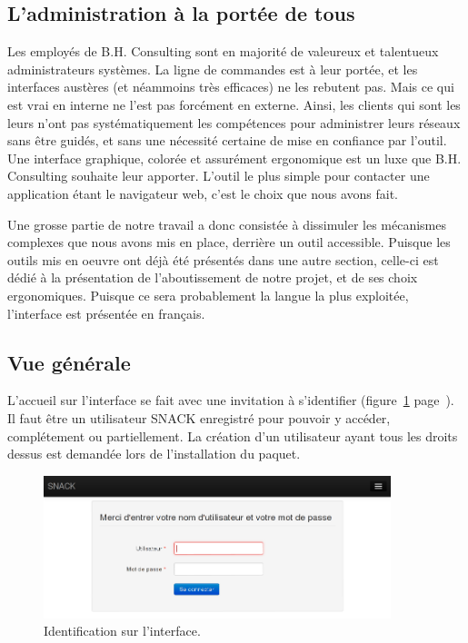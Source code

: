 \subsection{L'administration à la portée de tous}

Les employés de B.H. Consulting sont en majorité de valeureux et talentueux administrateurs systèmes. La ligne de commandes est à leur portée, et les interfaces austères (et néammoins très efficaces) ne les rebutent pas. Mais ce qui est vrai en interne ne l'est pas forcément en externe. Ainsi, les clients qui sont les leurs n'ont pas systématiquement les compétences pour administrer leurs réseaux sans être guidés, et sans une nécessité certaine de mise en confiance par l'outil. Une interface graphique, colorée et assurément ergonomique est un luxe que B.H. Consulting souhaite leur apporter. L'outil le plus simple pour contacter une application étant le navigateur web, c'est le choix que nous avons fait.

Une grosse partie de notre travail a donc consistée à dissimuler les mécanismes complexes que nous avons mis en place, derrière un outil accessible. Puisque les outils mis en oeuvre ont déjà été présentés dans une autre section, celle-ci est dédié à la présentation de l'aboutissement de notre projet, et de ses choix ergonomiques. Puisque ce sera probablement la langue la plus exploitée, l'interface est présentée en français.

\subsection{Vue générale}

L'accueil sur l'interface se fait avec une invitation à s'identifier (figure~\ref{login} page~\pageref{login}). Il faut être un utilisateur SNACK enregistré pour pouvoir y accéder, complétement ou partiellement. La création d'un utilisateur ayant tous les droits dessus est demandée lors de l'installation du paquet.

\begin{figure}[!h]
	\begin{center}
	    \includegraphics[width=0.9\textwidth]{img/login.png}
	\end{center}
	\caption{Identification sur l'interface.}
	\label{login}
\end{figure}


